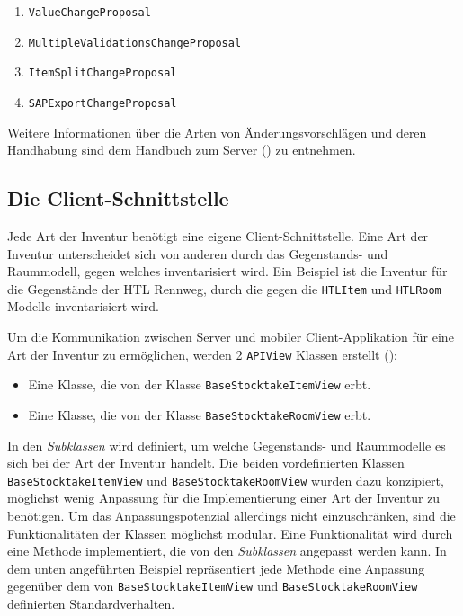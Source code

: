 \begin{enumerate}
\def\labelenumi{\arabic{enumi}.}
\tightlist
\item
  \texttt{ValueChangeProposal}
\item
  \texttt{MultipleValidationsChangeProposal}
\item
  \texttt{ItemSplitChangeProposal}
\item
  \texttt{SAPExportChangeProposal}
\end{enumerate}

Weitere Informationen über die Arten von Änderungsvorschlägen und deren
Handhabung sind dem Handbuch zum Server () zu
entnehmen.

\hypertarget{die-client-schnittstelle}{%
\subsection{Die Client-Schnittstelle}\label{die-client-schnittstelle}}

Jede Art der Inventur benötigt eine eigene Client-Schnittstelle. Eine
Art der Inventur unterscheidet sich von anderen durch das Gegenstands-
und Raummodell, gegen welches inventarisiert wird. Ein Beispiel ist die
Inventur für die Gegenstände der HTL Rennweg, durch die gegen die
\texttt{HTLItem} und \texttt{HTLRoom} Modelle inventarisiert wird.

Um die Kommunikation zwischen Server und mobiler Client-Applikation für
eine Art der Inventur zu ermöglichen, werden 2 \texttt{APIView} Klassen
erstellt ():

\begin{itemize}
\tightlist
\item
  Eine Klasse, die von der Klasse \texttt{BaseStocktakeItemView} erbt.
\item
  Eine Klasse, die von der Klasse \texttt{BaseStocktakeRoomView} erbt.
\end{itemize}

In den
\emph{Subklassen}
wird \ua{} definiert, um welche Gegenstands- und Raummodelle es sich bei
der Art der Inventur handelt. Die beiden vordefinierten Klassen
\texttt{BaseStocktakeItemView} und \texttt{BaseStocktakeRoomView} wurden
dazu konzipiert, möglichst wenig Anpassung für die Implementierung einer
Art der Inventur zu benötigen. Um das Anpassungspotenzial allerdings
nicht einzuschränken, sind die Funktionalitäten der Klassen möglichst
modular. Eine Funktionalität wird durch eine Methode implementiert, die
von den
\emph{Subklassen}
angepasst werden kann. In dem unten angeführten Beispiel repräsentiert
jede Methode eine Anpassung gegenüber dem von
\texttt{BaseStocktakeItemView} und \texttt{BaseStocktakeRoomView}
definierten Standardverhalten.

